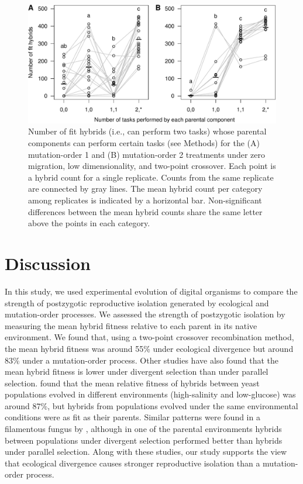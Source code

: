 \begin{doublespace}
\begin{figure}
\centering
\includegraphics[width=0.95\linewidth]{fit_hybrid_components.pdf}
\caption{Number of fit hybrids (i.e., can perform two tasks)
  whose parental components can perform certain tasks (see Methods)
  for the (A) mutation-order 1 and (B) mutation-order 2 treatments
  under zero migration, low dimensionality, and two-point crossover.
  Each point is a hybrid count for a single replicate.
  Counts from the same replicate are connected by gray lines.
  The mean hybrid count per category among replicates
  is indicated by a horizontal bar.
  Non-significant differences between the mean hybrid counts
  share the same letter above the points in each category.}
\label{fit_hybrid_components}
\end{figure}



\section{Discussion}

In this study, we used experimental evolution of digital organisms
to compare the strength of postzygotic reproductive isolation
generated by ecological and mutation-order processes.
%
We assessed the strength of postzygotic isolation
by measuring the mean hybrid fitness relative to each parent
in its native environment.
%
We found that, using a two-point crossover recombination method,
the mean hybrid fitness was around 55\% under ecological divergence
but around 83\% under a mutation-order process.
%
Other studies have also found that the mean hybrid fitness
is lower under divergent selection than under parallel selection.
%
\citet{det07} found that the mean relative fitness of hybrids
between yeast populations evolved in different environments
(high-salinity and low-glucose) was around 87\%,
but hybrids from populations evolved
under the same environmental conditions were as fit as their parents.
%
Similar patterns were found in a filamentous fungus by \citet{det08},
although in one of the parental environments
hybrids between populations under divergent selection
performed better than hybrids under parallel selection.
%
Along with these studies, our study supports
the view that ecological divergence causes
stronger reproductive isolation than a mutation-order process.




\end{doublespace}
